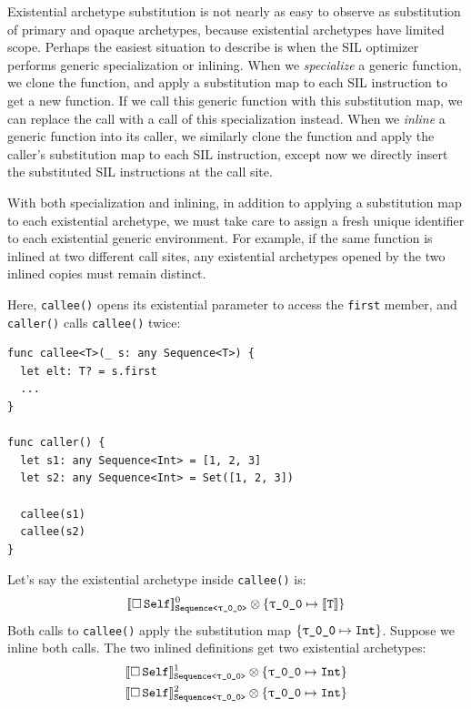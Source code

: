 \documentclass[../generics]{subfiles}
\begin{document}
Existential archetype substitution is not nearly as easy to observe as substitution of primary and opaque archetypes, because existential archetypes have limited scope. Perhaps the easiest situation to describe is when the SIL optimizer performs generic specialization or inlining. When we \emph{specialize} a generic function, we clone the function, and apply a substitution map to each SIL instruction to get a new function. If we call this generic function with this substitution map, we can replace the call with a call of this specialization instead. When we \emph{inline} a generic function into its caller, we similarly clone the function and apply the caller's substitution map to each SIL instruction, except now we directly insert the substituted SIL instructions at the call site.

With both specialization and inlining, in addition to applying a substitution map to each existential archetype, we must take care to assign a fresh unique identifier to each existential generic environment. For example, if the same function is inlined at two different call sites, any existential archetypes opened by the two inlined copies must remain distinct.

\begin{example}
Here, \texttt{callee()} opens its existential parameter to access the \texttt{first} member, and \texttt{caller()} calls \texttt{callee()} twice:
\begin{Verbatim}
func callee<T>(_ s: any Sequence<T>) {
  let elt: T? = s.first
  ...
}

func caller() {
  let s1: any Sequence<Int> = [1, 2, 3]
  let s2: any Sequence<Int> = Set([1, 2, 3])

  callee(s1)
  callee(s2)
}
\end{Verbatim}
Let's say the existential archetype inside \texttt{callee()} is:
\[
\ESelf^0_\texttt{Sequence<\rT>} \otimes \SubstMap{\SubstType{\rT}{$\archetype{T}$}}
\]
Both calls to \texttt{callee()} apply the substitution map $\SubstMap{\SubstType{\rT}{Int}}$. Suppose we inline both calls. The two inlined definitions get two existential archetypes:
\begin{gather*}
\ESelf^1_\texttt{Sequence<\rT>} \otimes \SubstMap{\SubstType{\rT}{Int}} \\
\ESelf^2_\texttt{Sequence<\rT>} \otimes \SubstMap{\SubstType{\rT}{Int}}
\end{gather*}
\end{example}
\end{document}
